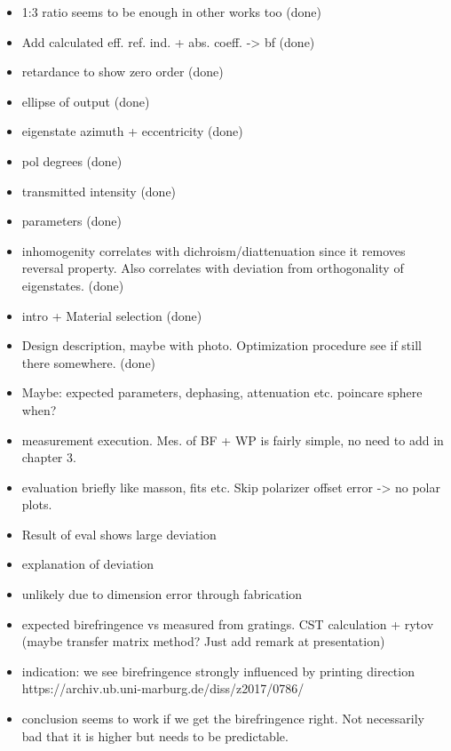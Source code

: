 \begin{itemize}
    \item 1:3 ratio seems to be enough in other works too (done)
    \item Add calculated eff. ref. ind. + abs. coeff. -> bf (done)
    \item retardance to show zero order (done)
    \item ellipse of output (done)
    \item eigenstate azimuth + eccentricity (done)
    \item pol degrees (done)
    \item transmitted intensity (done)
    \item parameters (done)
    \item inhomogenity correlates with dichroism/diattenuation since it removes reversal property. Also correlates with deviation from orthogonality of eigenstates. (done)
\end{itemize}



\begin{itemize}
    \item intro + Material selection (done)
    \item Design description, maybe with photo. Optimization procedure see if still there somewhere. (done)
    \item Maybe: expected parameters, dephasing, attenuation etc. poincare sphere when?
    \item measurement execution. Mes. of BF + WP is fairly simple, no need to add in chapter 3. 
    \item evaluation briefly like masson, fits etc. Skip polarizer offset error -> no polar plots.
    \item Result of eval shows large deviation
    \item explanation of deviation
    \item unlikely due to dimension error through fabrication
    \item expected birefringence vs measured from gratings. CST calculation + rytov (maybe transfer matrix method? Just add remark at presentation)
    \item indication: we see birefringence strongly influenced by printing direction https://archiv.ub.uni-marburg.de/diss/z2017/0786/ 
    \item conclusion seems to work if we get the birefringence right. Not necessarily bad that it is higher but needs to be predictable. 
\end{itemize}




